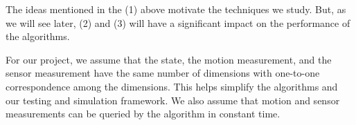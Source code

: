 The ideas mentioned in the (1) above motivate the techniques we study. But, as we will see later, (2) and (3) will have a significant impact on the performance of the algorithms.

For our project, we assume that the state, the motion measurement, and the sensor measurement have the same number of dimensions with one-to-one correspondence among the dimensions. This helps simplify the algorithms and our testing and simulation framework. We also assume that motion and sensor measurements can be queried by the algorithm in constant time.